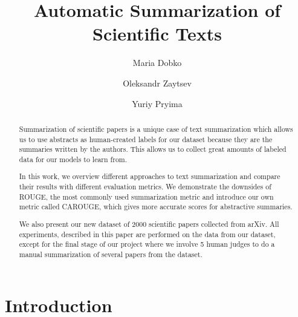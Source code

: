\documentclass[sigplan]{acmart}
\begin{document}
\title{Automatic Summarization of Scientific Texts}

\author{Maria Dobko}

\author{Oleksandr Zaytsev}

\author{Yuriy Pryima}

\begin{abstract}

Summarization of scientific papers is a unique case of text summarization which allows us to use abstracts as human-created labels for our dataset because they are the summaries written by the authors. This allows us to collect great amounts of labeled data for our models to learn from.
 
In this work, we overview different approaches to text summarization and compare their results with different evaluation metrics. We demonstrate the downsides of ROUGE, the most commonly used summarization metric and introduce our own metric called CAROUGE, which gives more accurate scores for abstractive summaries.

We also present our new dataset of 2000 scientific papers collected from arXiv. All experiments, described in this paper are performed on the data from our dataset, except for the final stage of our project where we involve 5 human judges to do a manual summarization of several papers from the dataset.

\end{abstract}


\maketitle

\section{Introduction}
\end{document}
